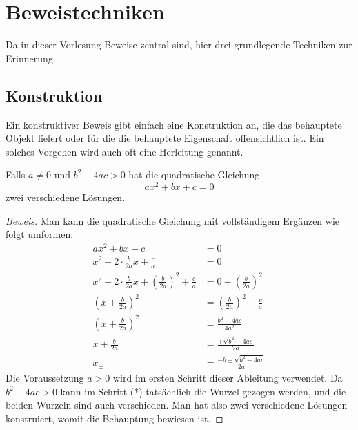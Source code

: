 %
%
%
\section{Beweistechniken}
Da in dieser Vorlesung Beweise zentral sind, hier drei grundlegende 
Techniken zur Erinnerung.

\subsection{Konstruktion}
%
Ein konstruktiver Beweis gibt einfach eine Konstruktion an, die
das behauptete Objekt liefert oder für die die behauptete Eigenschaft
offensichtlich ist.
Ein solches Vorgehen wird auch oft eine Herleitung genannt.

\begin{satz}
%
Falls $a\ne0$ und $b^2-4ac>0$ hat die quadratische Gleichung
\[
ax^2+bx+c=0
\]
zwei verschiedene Lösungen.
\end{satz}

\begin{proof}[Beweis]
Man kann die quadratische Gleichung mit vollständigem Ergänzen wie
folgt umformen:
{
\allowdisplaybreaks
\begin{align*}
ax^2+bx+c&=0\\
x^2+2\cdot \frac{b}{2a} x +\frac{c}a&=0\\
x^2+2\cdot \frac{b}{2a} x 
+\left(\frac{b}{2a}\right)^2
+\frac{c}a&=0
+\left(\frac{b}{2a}\right)^2\\
\left(x+\frac{b}{2a}\right)^2 &= \left(\frac{b}{2a}\right)^2 -\frac{c}a \\
\left(x+\frac{b}{2a}\right)^2 &=
\frac{b^2-4ac}{4a^2}\\
x+\frac{b}{2a}&=\frac{\pm\sqrt{b^2-4ac}}{2a}\tag{*}\\
x_{\pm}&=\frac{-b\pm\sqrt{b^2-4ac}}{2a}
\end{align*}
}
Die Voraussetzung $a>0$ wird im ersten Schritt dieser Ableitung verwendet.
Da $b^2-4ac>0$ kann im Schritt (*) tatsächlich die Wurzel gezogen werden,
und die beiden Wurzeln sind auch verschieden. Man hat also zwei verschiedene
Lösungen konstruiert, womit die Behauptung bewiesen ist.
\end{proof}


